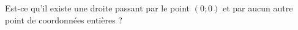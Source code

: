 
\begin{exercice}\label{exosmath-0544}

    Est-ce qu'il existe une droite passant par le point \( (0;0)\) et par aucun autre point de coordonnées entières ?

\end{exercice}
